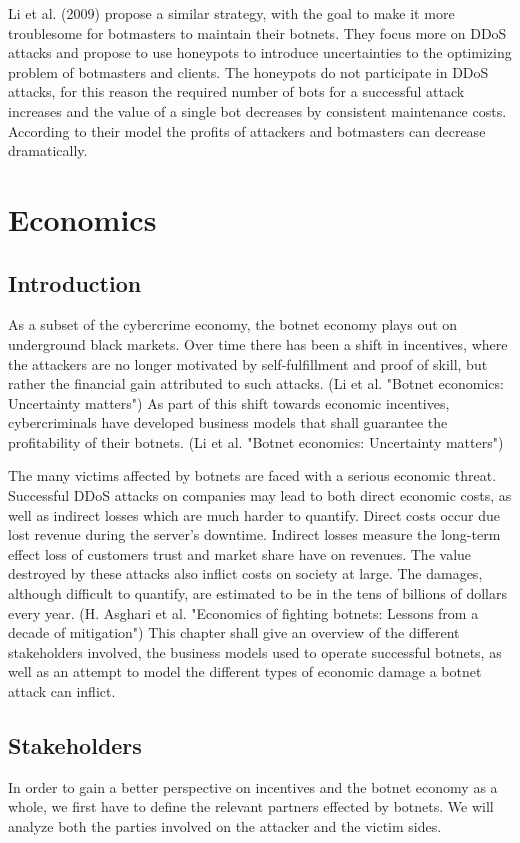 Li et al. (2009) propose a similar strategy, with the goal to make it more troublesome for botmasters to maintain their botnets. They focus more on DDoS attacks and propose to use honeypots to introduce uncertainties to the optimizing problem of botmasters and clients. The honeypots do not participate in DDoS attacks, for this reason the required number of bots for a successful attack increases and the value of a single bot decreases by consistent maintenance costs. According to their model the profits of attackers and botmasters can decrease dramatically.  \cite{Li09}

\section{Economics}
	\subsection{Introduction}
	As a subset of the cybercrime economy, the botnet economy plays out on underground black markets. Over time there has been a shift in incentives, where the attackers are no longer motivated by self-fulfillment and proof of skill, but rather the financial gain attributed to such attacks. (Li et al. "Botnet economics: Uncertainty matters") As part of this shift towards economic incentives, cybercriminals have developed business models that shall guarantee the profitability of their botnets. (Li et al. "Botnet economics: Uncertainty matters")

The many victims affected by botnets are faced with a serious economic threat. Successful DDoS attacks on companies may lead to both direct economic costs, as well as indirect losses which are much harder to quantify. Direct costs occur due lost revenue during the server's downtime. Indirect losses measure the long-term effect loss of customers trust and market share have on revenues. The value destroyed by these attacks also inflict costs on society at large. The damages, although difficult to quantify, are estimated to be in the tens of billions of dollars every year. (H. Asghari et al. "Economics of fighting botnets: Lessons from a decade of mitigation")
This chapter shall give an overview of the different stakeholders involved, the business models used to operate successful botnets, as well as an attempt to model the different types of economic damage a botnet attack can inflict. 

	\subsection{Stakeholders}
			In order to gain a better perspective on incentives and the botnet economy as a whole, we first have to define the relevant partners effected by botnets. We will analyze both the parties involved on the attacker and the victim sides.
			
